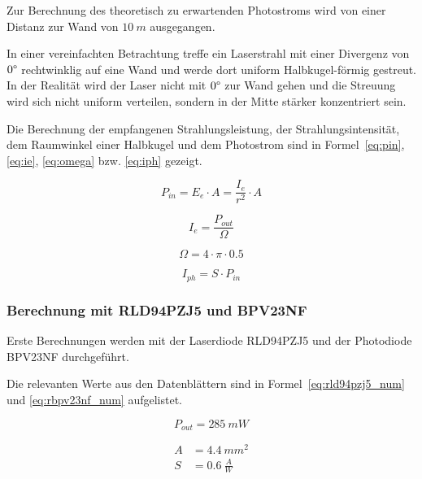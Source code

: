 Zur Berechnung des theoretisch zu erwartenden Photostroms wird von einer Distanz zur Wand von $10~m$ ausgegangen.

In einer vereinfachten Betrachtung treffe ein Laserstrahl mit einer Divergenz von $0\degree$ rechtwinklig auf eine Wand
und werde dort uniform Halbkugel-förmig gestreut. In der Realität wird der Laser nicht mit $0\degree$ zur Wand gehen und
die Streuung wird sich nicht uniform verteilen, sondern in der Mitte stärker konzentriert sein.

Die Berechnung der empfangenen Strahlungsleistung, der Strahlungsintensität, dem Raumwinkel einer Halbkugel und dem
Photostrom sind in Formel~\ref{eq:pin}, \ref{eq:ie}, \ref{eq:omega} bzw. \ref{eq:iph} gezeigt.

\begin{equation}\label{eq:pin}
    P_{in} = E_e \cdot A = \frac{I_e}{r^2} \cdot A
\end{equation}

\begin{equation}\label{eq:ie}
    I_e = \frac{P_{out}}{\Omega}
\end{equation}

\begin{equation}\label{eq:omega}
    \Omega = 4\cdot \pi \cdot 0.5
\end{equation}

\begin{equation}\label{eq:iph}
    I_{ph} = S \cdot P_{in}
\end{equation}

\subsubsection{Berechnung mit RLD94PZJ5 und BPV23NF}

Erste Berechnungen werden mit der Laserdiode RLD94PZJ5 \cite{rohm2020rld94pzj5_datasheet} und der Photodiode BPV23NF
\cite{vishay2024bpv23nf_datasheet} durchgeführt.

Die relevanten Werte aus den Datenblättern sind in Formel~\ref{eq:rld94pzj5_num} und \ref{eq:rbpv23nf_num} aufgelistet.

\begin{equation}\label{eq:rld94pzj5_num}
    P_{out} = 285~mW
\end{equation}

\begin{equation}\label{eq:rbpv23nf_num}
    \begin{split}
        A &= 4.4~mm^2\\
        S &= 0.6~\frac{A}{W}
    \end{split}
\end{equation}

